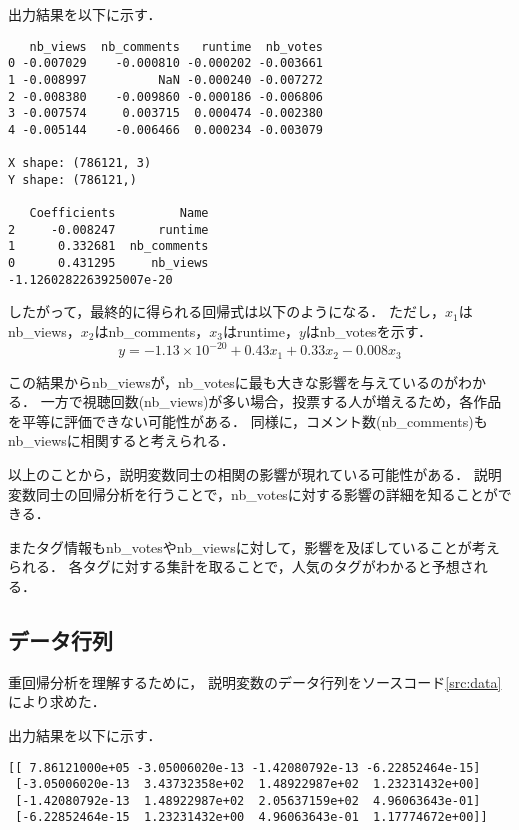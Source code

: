 \documentclass[uplatex]{jsarticle}
\begin{document}
出力結果を以下に示す．
\begin{screen}
\begin{verbatim}
   nb_views  nb_comments   runtime  nb_votes
0 -0.007029    -0.000810 -0.000202 -0.003661
1 -0.008997          NaN -0.000240 -0.007272
2 -0.008380    -0.009860 -0.000186 -0.006806
3 -0.007574     0.003715  0.000474 -0.002380
4 -0.005144    -0.006466  0.000234 -0.003079

X shape: (786121, 3)
Y shape: (786121,)

   Coefficients         Name
2     -0.008247      runtime
1      0.332681  nb_comments
0      0.431295     nb_views
-1.1260282263925007e-20
\end{verbatim}
\end{screen}

したがって，最終的に得られる回帰式は以下のようになる．
ただし，$x_1$はnb\_views，$x_2$はnb\_comments，$x_3$はruntime，$y$はnb\_votesを示す．
\begin{equation}
    y = -1.13\times 10^{-20} + 0.43 x_1 + 0.33 x_2 - 0.008 x_3
\end{equation}

この結果からnb\_viewsが，nb\_votesに最も大きな影響を与えているのがわかる．
一方で視聴回数(nb\_views)が多い場合，投票する人が増えるため，各作品を平等に評価できない可能性がある．
同様に，コメント数(nb\_comments)もnb\_viewsに相関すると考えられる．

以上のことから，説明変数同士の相関の影響が現れている可能性がある．
説明変数同士の回帰分析を行うことで，nb\_votesに対する影響の詳細を知ることができる．

またタグ情報もnb\_votesやnb\_viewsに対して，影響を及ぼしていることが考えられる．
各タグに対する集計を取ることで，人気のタグがわかると予想される．


\subsection{データ行列}

重回帰分析を理解するために，
説明変数のデータ行列をソースコード\ref{src:data}により求めた．



出力結果を以下に示す．
\begin{screen}
\begin{verbatim}
[[ 7.86121000e+05 -3.05006020e-13 -1.42080792e-13 -6.22852464e-15]
 [-3.05006020e-13  3.43732358e+02  1.48922987e+02  1.23231432e+00]
 [-1.42080792e-13  1.48922987e+02  2.05637159e+02  4.96063643e-01]
 [-6.22852464e-15  1.23231432e+00  4.96063643e-01  1.17774672e+00]]
\end{verbatim}
\end{screen}
\end{document}
